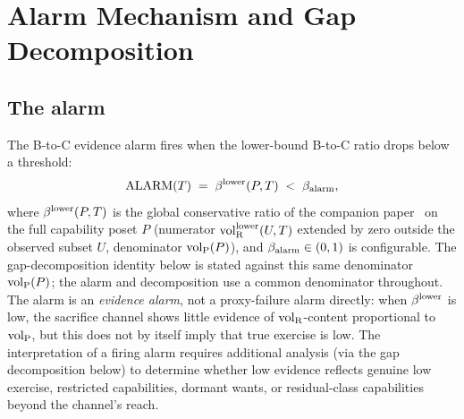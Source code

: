 \section{Alarm Mechanism and Gap Decomposition}
\label{sec:gap_decomposition}

\subsection{The alarm}

\begin{definition}
\label{def:alarm}
The B-to-C evidence alarm fires when the lower-bound B-to-C
ratio drops below a threshold:
\[
  \mathrm{ALARM}(T) \;=\; \beta^{\mathrm{lower}}(P, T) \;<\; \beta_{\mathrm{alarm}},
\]
where $\beta^{\mathrm{lower}}(P, T)$ is the global conservative ratio of the
companion paper~\citep[Revealed~Sacrifice]{lasser2026paper8a} on the full
capability poset $P$ (numerator ${\operatorname{vol}_{\mathrm{R}}^{\mathrm{lower}}}(U, T)$ extended by
zero outside the observed subset $U$, denominator ${\operatorname{vol}_{\mathrm{P}}}(P)$),
and $\beta_{\mathrm{alarm}} \in (0, 1)$ is configurable.  The
gap-decomposition identity below is stated against this same
denominator ${\operatorname{vol}_{\mathrm{P}}}(P)$; the alarm and decomposition use a
common denominator throughout.  The alarm is an
\emph{evidence alarm}, not a proxy-failure alarm directly: when
$\beta^{\mathrm{lower}}$ is low, the sacrifice channel shows little evidence of
${\operatorname{vol}_{\mathrm{R}}}$-content proportional to ${\operatorname{vol}_{\mathrm{P}}}$, but this does not by
itself imply that true exercise is low.  The interpretation of a
firing alarm requires additional analysis (via the gap
decomposition below) to determine whether low evidence reflects
genuine low exercise, restricted capabilities, dormant wants,
or residual-class capabilities beyond the channel's reach.
\end{definition}

